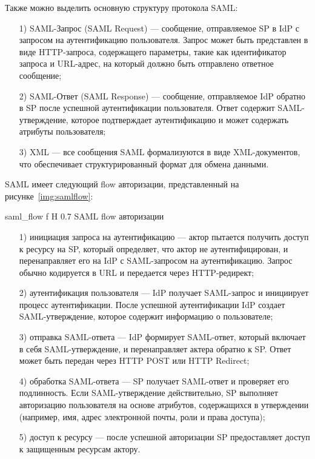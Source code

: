 Также можно выделить основную структуру протокола SAML:
 \begin{enumerate}
  \item[1)] SAML-Запрос (SAML Request) --- сообщение, отправляемое SP в IdP с запросом на аутентификацию пользователя. Запрос может быть представлен в виде HTTP-запроса, содержащего параметры, такие как идентификатор запроса и URL-адрес, на который должно быть отправлено ответное сообщение;
  \item[2)] SAML-Ответ (SAML Response) --- сообщение, отправляемое IdP обратно в SP после успешной аутентификации пользователя. Ответ содержит SAML-утверждение, которое подтверждает аутентификацию и может содержать атрибуты пользователя;
  \item[3)] XML --- все сообщения SAML формализуются в виде XML-документов, что обеспечивает  структурированный формат для обмена данными.
\end{enumerate}

SAML имеет следующий flow авторизации, представленный на рисунке~\ref{img:samlflow}:

    {saml_flow}
    {f}
    {H}
    {0.7\textwidth}
    {SAML flow авторизации}


 \begin{enumerate}
  \item[1)] инициация запроса на аутентификацию --- актор пытается получить доступ к ресурсу на SP, который определяет, что актор не аутентифицирован, и перенаправляет его на IdP с SAML-запросом на аутентификацию. Запрос обычно кодируется в URL и передается через HTTP-редирект;
  \item[2)] аутентификация пользователя --- IdP получает SAML-запрос и инициирует процесс аутентификации. После успешной аутентификации IdP создает SAML-утверждение, которое содержит информацию о пользователе;
  \item[3)] отправка SAML-ответа --- IdP формирует SAML-ответ, который включает в себя SAML-утверждение, и перенаправляет актера обратно к SP. Ответ может быть передан через HTTP POST или HTTP Redirect;
  \item[4)] обработка SAML-ответа --- SP получает SAML-ответ и проверяет его подлинность. Если SAML-утверждение действительно, SP выполняет авторизацию пользователя на основе атрибутов, содержащихся в утверждении (например, имя, адрес электронной почты, роли и права доступа);
  \item[5)] доступ к ресурсу --- после успешной авторизации SP предоставляет доступ к защищенным ресурсам актору.~\cite{saml}
\end{enumerate}

